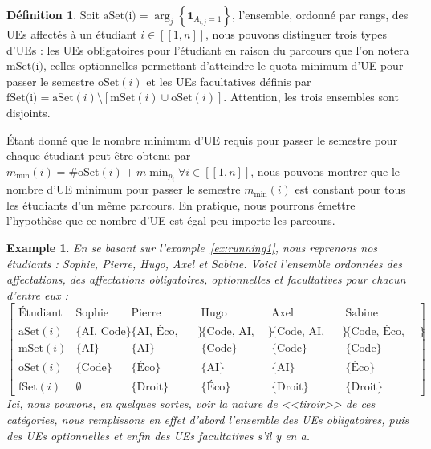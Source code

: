 \documentclass{rapport}
\theoremstyle{definition}
\newtheorem{definition}{Définition}
\theoremstyle{remark}
\theoremstyle{plain}
\newtheorem{example}{Example}
\theoremstyle{definition}
\theoremstyle{remark}
\newcommand{\llbracket}{[\![}
\newcommand{\rrbracket}{]\!]}
\begin{document}
\begin{definition}
    Soit $\text{aSet(i)}=\arg_j\left\{\mathbf{1}_{A_{i,j}=1}\right\}$, l'ensemble, ordonné par rangs, des UEs affectés à un étudiant $i\in \llbracket 1,n\rrbracket$, nous pouvons distinguer trois types d'UEs : 
    les UEs obligatoires pour l'étudiant en raison du parcours que l'on notera $\text{mSet(i)}$, 
    celles optionnelles permettant d'atteindre le quota minimum d'UE pour passer le semestre $\text{oSet}(i)$ 
    et les UEs facultatives définis par $\text{fSet(i)} = \text{aSet}(i)\setminus[\text{mSet}(i)\cup\text{oSet}(i)]$.
    Attention, les trois ensembles sont disjoints.
\end{definition}
Étant donné que le nombre minimum d'UE requis pour passer le semestre pour chaque étudiant peut être obtenu par $m_{\min}(i)=\#\text{oSet}(i)+m\!\min_{p_i} \forall i \in \llbracket 1,n \rrbracket$, 
nous pouvons montrer que le nombre d'UE minimum pour passer le semestre $m_{\min}(i)$ est constant pour tous les étudiants d'un même parcours. En pratique, nous pourrons émettre l'hypothèse que ce nombre d'UE
est égal peu importe les parcours.

\begin{example}\label{ex:running2}
    En se basant sur l'example~\ref{ex:running1}, nous reprenons nos étudiants : Sophie, Pierre, Hugo, Axel et Sabine. Voici l'ensemble ordonnées des affectations, des affectations obligatoires, optionnelles et facultatives pour chacun d'entre eux :
    $$
    \begin{bmatrix}
        \text{Étudiant} & \text{Sophie} & \text{Pierre} & \text{Hugo} & \text{Axel} & \text{Sabine}\\
        \text{aSet}(i) & \{\text{AI, Code}\} & \{\text{AI, Éco, Droit}\} & \{\text{Code, AI, Éco}\} & \{\text{Code, AI, Droit}\} & \{\text{Code, Éco, Droit}\}\\
        \text{mSet}(i) & \{\text{AI}\} & \{\text{AI}\} & \{\text{Code}\} & \{\text{Code}\} & \{\text{Code}\}\\
        \text{oSet}(i) & \{\text{Code}\} & \{\text{Éco}\} & \{\text{AI}\} & \{\text{AI}\} & \{\text{Éco}\}\\
        \text{fSet}(i) & \emptyset & \{\text{Droit}\} & \{\text{Éco}\} & \{\text{Droit}\} & \{\text{Droit}\}
    \end{bmatrix}
    $$
    Ici, nous pouvons, en quelques sortes, voir la nature de <<tiroir>> de ces catégories, nous remplissons en effet d'abord l'ensemble des UEs obligatoires, puis des UEs optionnelles et enfin des UEs facultatives s'il y en a. 
\end{example}
\end{document}
